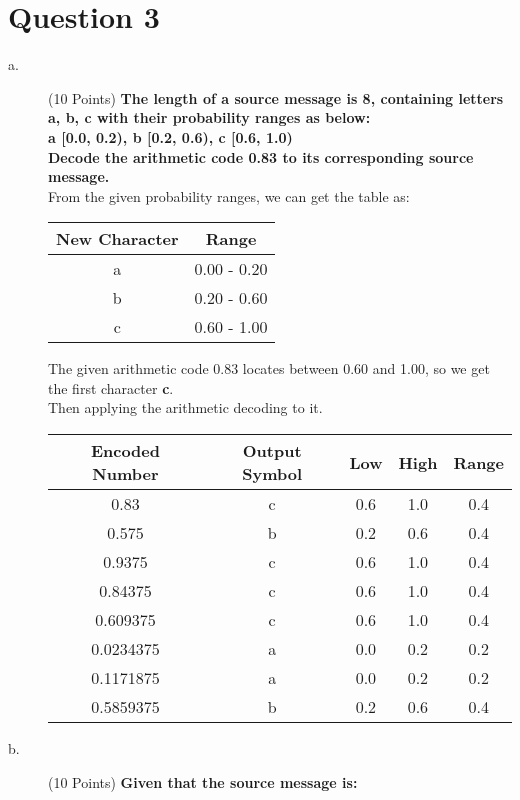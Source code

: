 \documentclass[a4paper]{article}
\begin{document}
\section* {Question 3}
  \begin{spacing}{1.5}
    \begin{description}
      \item[a.] (10 Points) \textbf{The length of a source message is 8, containing letters a, b, c with their probability ranges as below:\\
      a [0.0, 0.2), b [0.2, 0.6), c [0.6, 1.0)\\
      Decode the arithmetic code 0.83 to its corresponding source message.}\\
      From the given probability ranges, we can get the table as:\\
      \begin{center}
        \begin{tabular}{ c c }
          New Character & Range \\
          \hline
          a & 0.00 - 0.20 \\
          b & 0.20 - 0.60 \\
          c & 0.60 - 1.00 \\
        \end{tabular}
      \end{center}
      The given arithmetic code 0.83 locates between 0.60 and 1.00, so we get the first character \textbf{c}.\\
      Then applying the arithmetic decoding to it.\\
      \begin{tabular} { c c c c c }
        Encoded Number & Output Symbol & Low & High & Range \\ \hline
        0.83 & c & 0.6 & 1.0 & 0.4 \\
        0.575 & b & 0.2 & 0.6 & 0.4 \\
        0.9375 & c & 0.6 & 1.0 & 0.4 \\
        0.84375 & c & 0.6 & 1.0 & 0.4 \\
        0.609375 & c & 0.6 & 1.0 & 0.4 \\
        0.0234375 & a & 0.0 & 0.2 & 0.2 \\
        0.1171875 & a & 0.0 & 0.2 & 0.2 \\
        0.5859375 & b & 0.2 & 0.6 & 0.4 \\
      \end{tabular}
      \item[b.] (10 Points) \textbf{Given that the source message is:\\
}
\end{description}
\end{spacing}
\end{document}
